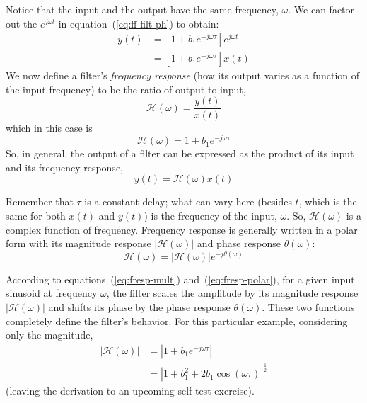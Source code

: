 Notice that the input and the output have the same frequency,
$\omega$. We can factor out the $e^{j\omega t}$ in
equation~(\ref{eq:ff-filt-ph}) to obtain:
\begin{align}
y(t) &= [1 + b_1 e^{-j\omega \tau}] e^{j\omega t}\\
&= [1 + b_1 e^{-j\omega \tau}] x(t)
\end{align}
%
We now define a filter's \emph{frequency response} (how its output
varies as a function of the input frequency) to be the ratio of
output to input,
\begin{equation}
\mathcal{H}(\omega) = \frac{y(t)}{x(t)}
\end{equation}
which in this case is
\begin{equation}
\mathcal{H}(\omega) = 1+b_1 e^{-j\omega \tau}
\end{equation}
So, in general, the output of a filter can be expressed as the product
of its input and its frequency response,
\begin{equation}
 y(t) = \mathcal{H}(\omega) x(t) \label{eq:fresp-mult}
\end{equation}

Remember that $\tau$
is a constant delay; what can vary here (besides $t$, which is the
same for both $x(t)$ and $y(t)$) is the frequency of the input,
$\omega$. So, $\mathcal{H}(\omega)$ is a complex function of frequency.
Frequency response is generally written in a polar form with its
magnitude response $|\mathcal{H}(\omega)|$ and phase response
$\theta(\omega)$:
\begin{equation}
\mathcal{H}(\omega)= |\mathcal{H}(\omega)|e^{-j\theta(\omega)}
\label{eq:fresp-polar}
\end{equation}

According to equations~(\ref{eq:fresp-mult})
and~(\ref{eq:fresp-polar}), for a given input sinusoid at frequency 
$\omega$, the filter scales the amplitude by its
magnitude response $|\mathcal{H}(\omega)|$ and shifts its phase by the
phase response $\theta(\omega)$. These two functions  completely define the
filter's behavior. For this particular example, considering only the
magnitude,
\begin{align}
|\mathcal{H}(\omega)| &= |1+b_1 e^{-j\omega \tau}| \label{eq:ff-mha}\\
           &= |1+b_1^2 + 2b_1 \cos(\omega\tau)|^\frac{1}{2}
\label{eq:ff-mh}
\end{align}
(leaving the derivation to an upcoming self-test exercise).

